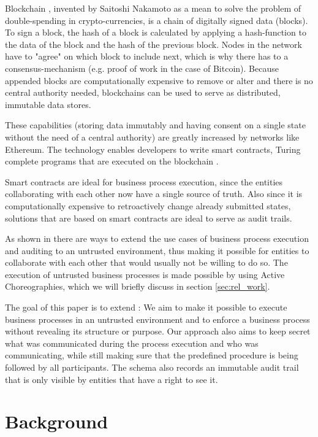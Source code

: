 \documentclass[runningheads]{llncs}
\begin{document}
Blockchain \cite{nakamoto2008bitcoin}, invented by Saitoshi Nakamoto as a mean to solve the problem of double-spending in crypto-currencies, is a chain of digitally signed data (blocks). To sign a block, the hash of a block is calculated by applying a hash-function to the data of the block and the hash of the previous block. Nodes in the network have to "agree" on which block to include next, which is why there has to a consensus-mechanism (e.g. proof of work in the case of Bitcoin). Because appended blocks are computationally expensive to remove or alter and there is no central authority needed, blockchains can be used to serve as distributed, immutable data stores.

These capabilities (storing data immutably and having consent on a single state without the need of a  central authority) are greatly increased by networks like Ethereum. The technology enables developers to write smart contracts, Turing complete programs that are executed on the blockchain \cite{buterin2014next}.

Smart contracts are ideal for business process execution, since the entities collaborating with each other now have a single source of truth. Also since it is computationally expensive to retroactively change already submitted states, solutions that are based on smart contracts are ideal to serve as audit trails.

As shown in \cite{weber2016untrusted} there are ways to extend the use cases of business process execution and auditing to an untrusted environment, thus making it possible for entities to collaborate with each other that would usually not be  willing to do so. The execution of untrusted business processes is made possible by using Active Choreographies, which we will briefly discuss in section \ref{sec:rel_work}.

The goal of this paper is to extend \cite{weber2016untrusted}: We aim to make it possible to execute business processes in an untrusted environment and to enforce a business process without revealing its structure or purpose. Our approach also aims to keep secret what was communicated during the process execution and who was communicating, while still making sure that the predefined procedure is being followed by all participants. The schema also records an immutable audit trail that is only visible by entities that have a right to see it. 



\section{Background} \label{sec:background}
\end{document}
